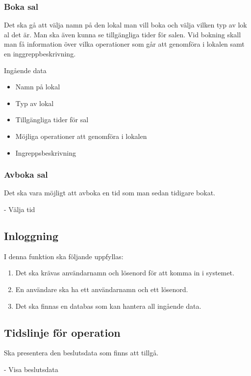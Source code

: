 \documentclass[a4paper,10pt, twoside]{article}
\begin{document}
\subsubsection{Boka sal}
\label{sec: Boka sal}
Det ska gå att välja namn på den lokal man vill boka och välja vilken typ av lok
al det är. Man ska även kunna se tillgängliga tider för salen. Vid
bokning skall man få information över vilka operationer som går att genomföra i
lokalen samt en inggreppbeskrivning.

Ingående data
\begin{multicols}{2}
\begin{itemize}
	\item Namn på lokal
	\item Typ av lokal
	\item Tillgängliga tider för sal
	\item Möjliga operationer att genomföra i lokalen
	\item Ingreppsbeskrivning
\end{itemize}
\end{multicols}

\subsubsection{Avboka sal}
\label{sec: Avboka sal}
Det ska vara möjligt att avboka en tid som man sedan tidigare bokat.

-	Välja tid

\subsection{Inloggning}
\label{sec: Inloggning}
I denna funktion ska följande uppfyllas:
\begin{enumerate}
	\item Det ska krävas användarnamn och lösenord för att komma in i systemet.
  	\item En användare ska ha ett användarnamn och ett lösenord.
  	\item Det ska finnas en databas som kan hantera all ingående data.
\end{enumerate}

\subsection{Tidslinje för operation}
\label{sec: Tidlinje för operation}
Ska presentera den beslutsdata som finns att tillgå.

-	Visa beslutsdata
\end{document}
